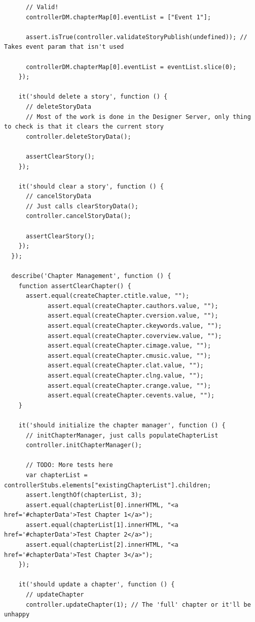 \documentclass[12pt]{ucthesis}
\begin{document}
\begin{lstlisting}
      // Valid!
      controllerDM.chapterMap[0].eventList = ["Event 1"];

      assert.isTrue(controller.validateStoryPublish(undefined)); // Takes event param that isn't used
    
      controllerDM.chapterMap[0].eventList = eventList.slice(0);
    });

    it('should delete a story', function () {
      // deleteStoryData
      // Most of the work is done in the Designer Server, only thing to check is that it clears the current story
      controller.deleteStoryData();

      assertClearStory();
    });

    it('should clear a story', function () {
      // cancelStoryData
      // Just calls clearStoryData();
      controller.cancelStoryData();

      assertClearStory();
    });
  });
  
  describe('Chapter Management', function () {
    function assertClearChapter() {
      assert.equal(createChapter.ctitle.value, "");
            assert.equal(createChapter.cauthors.value, "");
            assert.equal(createChapter.cversion.value, "");
            assert.equal(createChapter.ckeywords.value, "");
            assert.equal(createChapter.coverview.value, "");
            assert.equal(createChapter.cimage.value, "");
            assert.equal(createChapter.cmusic.value, "");
            assert.equal(createChapter.clat.value, "");
            assert.equal(createChapter.clng.value, "");
            assert.equal(createChapter.crange.value, "");
            assert.equal(createChapter.cevents.value, "");
    }

    it('should initialize the chapter manager', function () {
      // initChapterManager, just calls populateChapterList
      controller.initChapterManager();

      // TODO: More tests here
      var chapterList = controllerStubs.elements["existingChapterList"].children;
      assert.lengthOf(chapterList, 3);
      assert.equal(chapterList[0].innerHTML, "<a href='#chapterData'>Test Chapter 1</a>");
      assert.equal(chapterList[1].innerHTML, "<a href='#chapterData'>Test Chapter 2</a>");
      assert.equal(chapterList[2].innerHTML, "<a href='#chapterData'>Test Chapter 3</a>");  
    });

    it('should update a chapter', function () {
      // updateChapter
      controller.updateChapter(1); // The 'full' chapter or it'll be unhappy


\end{lstlisting}
\end{document}
